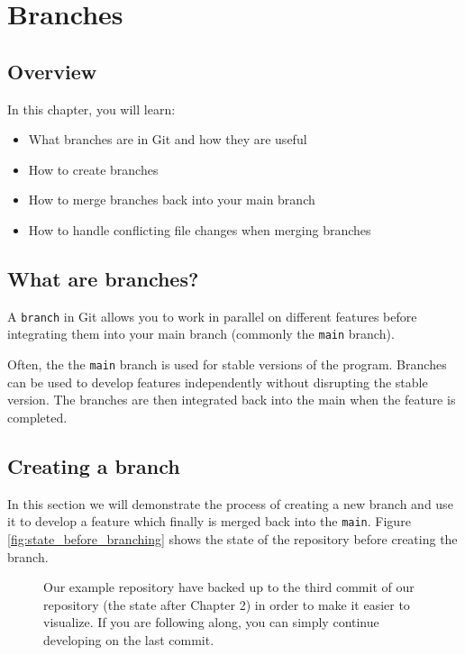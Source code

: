 \documentclass[../main/git_course_main.tex]{subfiles}
\begin{document}
	
	\setcounter{chapter}{3}
	\chapter{Branches}
	
	\section{Overview}
	
	In this chapter, you will learn:
	
	\begin{itemize}
		\item What branches are in Git and how they are useful
		\item How to create branches
		\item How to merge branches back into your main branch
		\item How to handle conflicting file changes when merging branches
	\end{itemize}
	
	\section{What are branches?}
	
	A \verb$branch$ in Git allows you to work in parallel on different features before integrating them into your main branch (commonly the \verb$main$ branch).
	
	Often, the the \verb$main$ branch is used for stable versions of the program. Branches can be used to develop features independently without disrupting the stable version. The branches are then integrated back into the main when the feature is completed.
	
	\section{Creating a branch}
	
	In this section we will demonstrate the process of creating a new branch and use it to develop a feature which finally is merged back into the \verb$main$. Figure \ref{fig:state_before_branching} shows the state of the repository before creating the branch. 
	
	\begin{figure}[h!]
		\begin{redbox}
			Our example repository have backed up to the third commit of our repository (the state after Chapter 2) in order to make it easier to visualize. If you are following along, you can simply continue developing on the last commit.
		\end{redbox}
	\end{figure}
	
\end{document}
